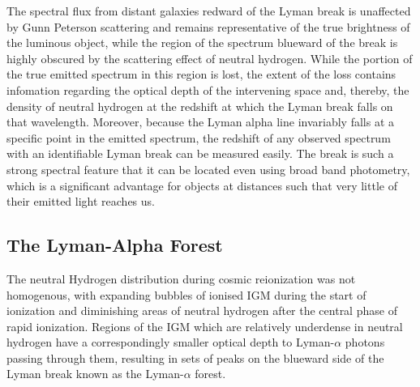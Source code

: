 		The spectral flux from distant galaxies redward of the Lyman break is unaffected by Gunn Peterson scattering and remains representative of the true brightness of the luminous object, while the region of the spectrum blueward of the break is highly obscured by the scattering effect of neutral hydrogen. While the portion of the true emitted spectrum in this region is lost, the extent of the loss contains infomation regarding the optical depth of the intervening space and, thereby, the density of neutral hydrogen at the redshift at which the Lyman break falls on that wavelength. Moreover, because the Lyman alpha line invariably falls at a specific point in the emitted spectrum, the redshift of any observed spectrum with an identifiable Lyman break can be measured easily. The break is such a strong spectral feature that it can be located even using broad band photometry, which is a significant advantage for objects at distances such that very little of their emitted light reaches us.

	\subsection{The Lyman-Alpha Forest} %
	\label{sub:the_lyman_alpha_forest}
		The neutral Hydrogen distribution during cosmic reionization was not homogenous, with expanding bubbles of ionised IGM during the start of ionization and diminishing areas of neutral hydrogen after the central phase of rapid ionization. Regions of the IGM which are relatively underdense in neutral hydrogen have a correspondingly smaller optical depth to Lyman-$\alpha$ photons passing through them, resulting in sets of peaks on the blueward side of the Lyman break known as the Lyman-$\alpha$ forest.

